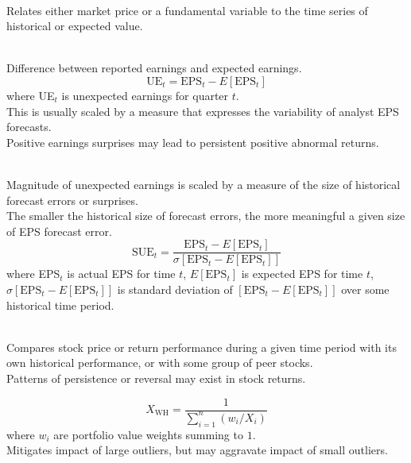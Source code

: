 \begin{definition} \\
Relates either market price or a fundamental variable to the time series of historical or expected value.
\end{definition}

\begin{definition} \\
Difference between reported earnings and expected earnings.
\begin{equation}
\text{UE}_t = \text{EPS}_t - E[\text{EPS}_t] \nonumber
\end{equation}
where UE$_t$ is unexpected earnings for quarter $t$.\\
This is usually scaled by a measure that expresses the variability of analyst EPS forecasts.\\
Positive earnings surprises may lead to persistent positive abnormal returns.
\end{definition}

\begin{definition} \\
Magnitude of unexpected earnings is scaled by a measure of the size of historical forecast errors or surprises.\\
The smaller the historical size of forecast errors, the more meaningful a given size of EPS forecast error.
\begin{equation}
\text{SUE}_t = \frac{\text{EPS}_t - E[\text{EPS}_t]}{\sigma[\text{EPS}_t - E[\text{EPS}_t]]} \nonumber
\end{equation}
where EPS$_t$ is actual EPS for time $t$, $E[\text{EPS}_t]$ is expected EPS for time $t$, $\sigma[\text{EPS}_t - E[\text{EPS}_t]]$ is standard deviation of $[\text{EPS}_t - E[\text{EPS}_t]]$ over some historical time period.
\end{definition}

\begin{definition} \\
Compares stock price or return performance during a given time period with its own historical performance, or with some group of peer stocks.\\
Patterns of persistence or reversal may exist in stock returns.
\end{definition}

\begin{definition} 
\begin{equation}
X_{\text{WH}} = \frac{1}{\sum\limits_{i=1}^n (w_i / X_i)} \nonumber
\end{equation}
where $w_i$ are portfolio value weights summing to $1$.\\
Mitigates impact of large outliers, but may aggravate impact of small outliers.
\end{definition}